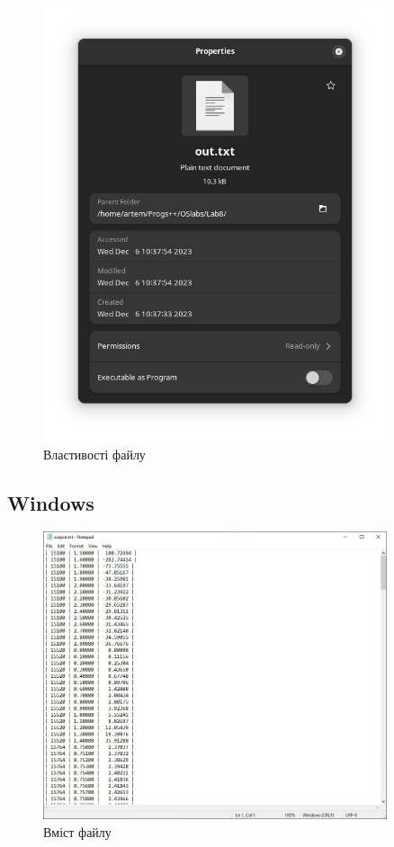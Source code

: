 \documentclass[12pt]{extarticle}
\begin{document}
\begin{figure}[H]
    \centering
    \includegraphics[width=0.90\textwidth]{linux_prop}
    \caption{Властивості файлу}
\end{figure}

\subsection*{Windows}

\begin{figure}[H]
    \centering
    \includegraphics[width=0.90\textwidth]{win_txt}
    \caption{Вміст файлу}
\end{figure}
\end{document}
